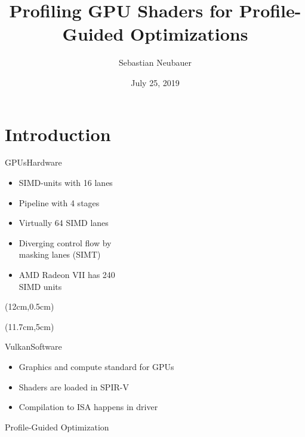 \documentclass[xcolor={usenames,dvipsnames}, aspectratio=169, 12pt]{beamer}
\title[Master Thesis]{Profiling GPU Shaders for Profile-Guided Optimizations}
\author[S. Neubauer]{Sebastian Neubauer}
\date{July 25, 2019}
\institute{Technische Universität München}
\begin{document}
\frame[plain]{\titlepage}

\section{Introduction}

\begin{frame}{GPUs}{Hardware}
\begin{itemize}
	\item SIMD-units with 16 lanes
	\item Pipeline with 4 stages
	\item Virtually 64 SIMD lanes
	\item Diverging control flow by\\masking lanes (SIMT)
	\item AMD Radeon VII has 240\\SIMD units
\end{itemize}
\begin{textblock*}{5cm}(12cm,0.5cm)
	
\end{textblock*}
\begin{textblock*}{5cm}(11.7cm,5cm)

\end{textblock*}
\end{frame}

{\framelogo{\centering}
\begin{frame}{Vulkan}{Software}
\begin{itemize}
	\item Graphics and compute standard for GPUs
	\item Shaders are loaded in SPIR-V
	\item Compilation to ISA happens in driver
\end{itemize}
\end{frame}}

\begin{frame}{}{Profile-Guided Optimization}

\end{frame}
\end{document}
